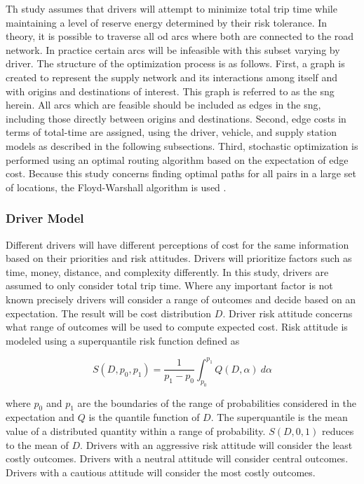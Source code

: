 Th study assumes that drivers will attempt to minimize total trip time while maintaining a level of reserve energy determined by their risk tolerance. In theory, it is possible to traverse all \gls{od} arcs where both are connected to the road network. In practice certain arcs will be infeasible with this subset varying by driver. The structure of the optimization process is as follows. First, a graph is created to represent the supply network and its interactions among itself and with origins and destinations of interest. This graph is referred to as the \gls{sng} herein. All arcs which are feasible should be included as edges in the \gls{sng}, including those directly between origins and destinations. Second, edge costs in terms of total-time are assigned, using the driver, vehicle, and supply station models as described in the following subsections. Third, stochastic optimization is performed using an optimal routing algorithm based on the expectation of edge cost. Because this study concerns finding optimal paths for all pairs in a large set of locations, the Floyd-Warshall algorithm is used \cite{Floyd_1962, Warshall_1962}.

\subsubsection*{Driver Model}

Different drivers will have different perceptions of cost for the same information based on their priorities and risk attitudes. Drivers will prioritize factors such as time, money, distance, and complexity differently. In this study, drivers are assumed to only consider total trip time. Where any important factor is not known precisely drivers will consider a range of outcomes and decide based on an expectation. The result will be cost distribution $D$. Driver risk attitude concerns what range of outcomes will be used to compute expected cost. Risk attitude is modeled using a superquantile risk function defined as

\begin{equation}
	S(D, p_0, p_1) = \frac{1}{p_1 - p_0}\int_{p_0}^{p_1}Q(D, \alpha)\ d\alpha \label{eq:superquantile}
\end{equation}

\noindent where $p_0$ and $p_1$ are the boundaries of the range of probabilities considered in the expectation and $Q$ is the quantile function of $D$. The superquantile is the mean value of a distributed quantity within a range of probability. $S(D, 0, 1)$ reduces to the mean of $D$. Drivers with an aggressive risk attitude will consider the least costly outcomes. Drivers with a neutral attitude will consider central outcomes. Drivers with a cautious attitude will consider the most costly outcomes.

